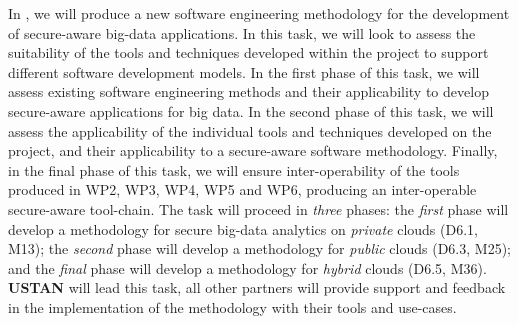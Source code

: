 \begin{Workpackage}{\thewpno}
\begin{Task}
	In \theTask, we will produce a new software engineering methodology for the development of secure-aware big-data applications. In this task, we will look to assess the suitability of the tools and techniques developed within the project to support different software development models. 
	In the first phase of this task, we will assess existing  software engineering methods and their applicability to develop secure-aware applications for big data.
	In the second phase of this task, we will assess the applicability of the individual tools and techniques developed on the \TheProject{} project, and their applicability to a secure-aware software methodology. 
	Finally, in the final phase of this task, we will ensure inter-operability of the tools produced in WP2, WP3, WP4, WP5 and WP6, producing an inter-operable secure-aware tool-chain. The task will proceed in \emph{three} phases: the \emph{first} phase will develop a methodology for secure big-data analytics on \emph{private} clouds (D6.1, M13); the \emph{second} phase will develop a methodology for \emph{public} clouds (D6.3, M25); and the \emph{final} phase will develop a methodology for \emph{hybrid} clouds (D6.5, M36). \textbf{USTAN} will lead this task, all other partners will provide support and feedback in the implementation of the methodology with their tools and use-cases.
\end{Task}


%	
%	



\end{Workpackage}

